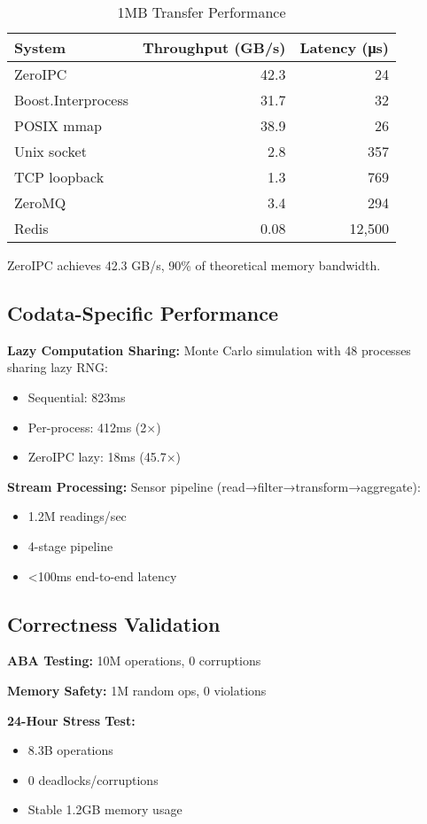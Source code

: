 \documentclass[sigconf,anonymous]{acmart}
\begin{document}
\begin{table}[h]
\centering
\caption{1MB Transfer Performance}
\label{tab:comparison}
\begin{tabular}{lrr}
\toprule
System & Throughput (GB/s) & Latency (μs) \\
\midrule
ZeroIPC & 42.3 & 24 \\
Boost.Interprocess & 31.7 & 32 \\
POSIX mmap & 38.9 & 26 \\
Unix socket & 2.8 & 357 \\
TCP loopback & 1.3 & 769 \\
ZeroMQ & 3.4 & 294 \\
Redis & 0.08 & 12,500 \\
\bottomrule
\end{tabular}
\end{table}

ZeroIPC achieves 42.3 GB/s, 90\% of theoretical memory bandwidth.

\subsection{Codata-Specific Performance}

\textbf{Lazy Computation Sharing:}
Monte Carlo simulation with 48 processes sharing lazy RNG:
\begin{itemize}
\item Sequential: 823ms
\item Per-process: 412ms (2×)
\item ZeroIPC lazy: 18ms (45.7×)
\end{itemize}

\textbf{Stream Processing:}
Sensor pipeline (read→filter→transform→aggregate):
\begin{itemize}
\item 1.2M readings/sec
\item 4-stage pipeline
\item <100ms end-to-end latency
\end{itemize}

\subsection{Correctness Validation}

\textbf{ABA Testing:} 10M operations, 0 corruptions

\textbf{Memory Safety:} 1M random ops, 0 violations

\textbf{24-Hour Stress Test:}
\begin{itemize}
\item 8.3B operations
\item 0 deadlocks/corruptions
\item Stable 1.2GB memory usage
\end{itemize}
\end{document}
